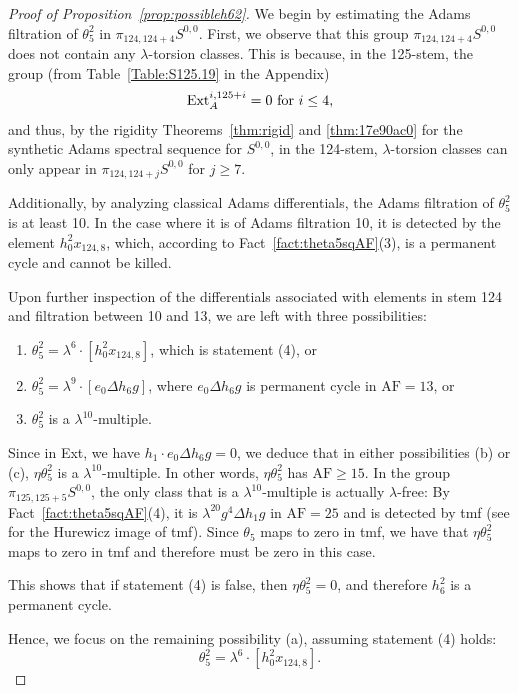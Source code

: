\documentclass{amsart}
\numberwithin{equation}{section}
\newcommand{\AF}{\mathrm{AF}}
\begin{document}
\begin{proof}[Proof of Proposition~\ref{prop:possibleh62}]
We begin by estimating the Adams filtration of $\theta_5^2$ in   $\pi_{124,124+4} S^{0,0}$. First, we observe that this group  $\pi_{124,124+4} S^{0,0}$ does not contain any $\lambda$-torsion classes. 
This is because, in the 125-stem, the group (from Table~\ref{Table:S125.19} in the Appendix) 
$$\mathrm{Ext}_A^{i,125+i} = 0 \ \text{for} \ i\leq 4,$$ 
and thus, by the rigidity Theorems~\ref{thm:rigid} and \ref{thm:17e90ac0} for the synthetic Adams spectral sequence for $S^{0,0}$, in the 124-stem, $\lambda$-torsion classes can only appear in $\pi_{124,124+j} S^{0,0}$ for $j \geq 7$.

Additionally, by analyzing classical Adams differentials, the Adams filtration of $\theta_5^2$ is at least 10. In the case where it is of Adams filtration 10, it is detected by the element $h_0^2 x_{124,8}$, which, according to Fact~\ref{fact:theta5sqAF}(3), is a permanent cycle and cannot be killed. 

Upon further inspection of the differentials associated with elements in stem 124 and filtration between 10 and 13, we are left with three possibilities:
\begin{enumerate}[label=(\alph*)]
    \item $\theta_5^2 = \lambda^6 \cdot [h_0^2 x_{124,8}]$, which is statement (4), or
    \item $\theta_5^2 = \lambda^9 \cdot [e_0 \Delta h_6 g]$, where $e_0 \Delta h_6 g$ is permanent cycle in $\AF=13$, or
    \item $\theta_5^2$ is a $\lambda^{10}$-multiple.
\end{enumerate}

Since in Ext, we have $h_1 \cdot e_0 \Delta h_6 g = 0$, we deduce that in either possibilities (b) or (c), $\eta \theta_5^2$ is a $\lambda^{10}$-multiple. In other words, $\eta \theta_5^2$ has $\AF \ge 15$. In the group $\pi_{125,125+5} S^{0,0}$, the only class that is a $\lambda^{10}$-multiple is actually $\lambda$-free: By Fact~\ref{fact:theta5sqAF}(4), it is $\lambda^{20} g^4 \Delta h_1 g$ in $\AF=25$ and is detected by tmf (see \cite{tmf} for the Hurewicz image of tmf). Since $\theta_5$ maps to zero in tmf, we have that $\eta \theta_5^2$ maps to zero in tmf and therefore must be zero in this case. 

This shows that if statement (4) is false, then $\eta \theta_5^2 = 0$, and therefore $h_6^2$ is a permanent cycle.

Hence, we focus on the remaining possibility (a), assuming statement (4) holds:
$$\theta_5^2 = \lambda^6 \cdot [h_0^2 x_{124,8}].$$


\end{proof}
\end{document}
